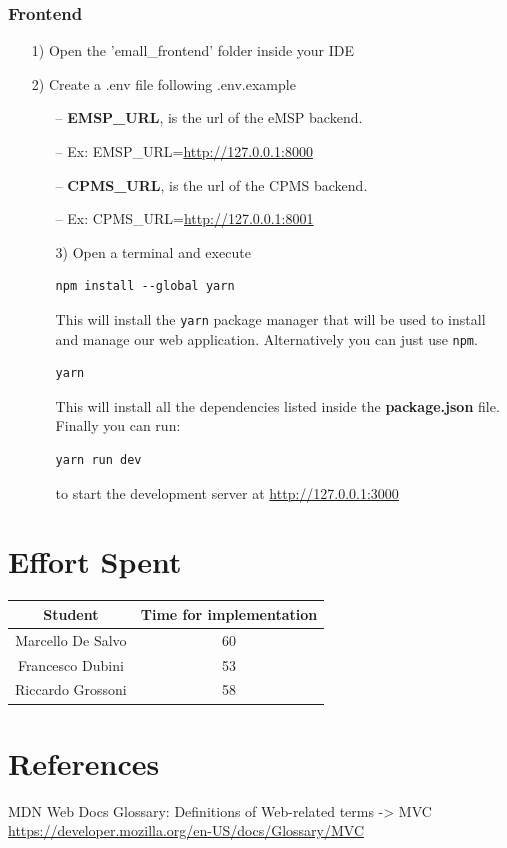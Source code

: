 \documentclass[table, 12pt]{article}
\begin{document}
\subsubsection{Frontend}
\begin{itemize}
    \item[1)] Open the 'emall\_frontend' folder inside your IDE
    \item[2)] Create a .env file following .env.example
    \begin{itemize}
        \item[--]   \textbf{EMSP\_URL}, is the url of the eMSP backend. 
        \item[--]   Ex: EMSP\_URL=\url{http://127.0.0.1:8000}
        \item[--]   \textbf{CPMS\_URL}, is the url of the CPMS backend.
        \item[--]   Ex: CPMS\_URL=\url{http://127.0.0.1:8001}
    \end{itemize}
    \begin{itemize}
        \item[3)] Open a terminal and execute
        \begin{lstlisting}[language=shell]
        npm install --global yarn
        \end{lstlisting}
        This will install the \texttt{yarn} package manager that will be used to install and manage our web application.
        Alternatively you can just use \texttt{npm}.
        \begin{lstlisting}[language=shell]
        yarn
        \end{lstlisting}
        This will install all the dependencies listed inside the \textbf{package.json} file.\\
        Finally you can run:
        \begin{lstlisting}[language=shell]
        yarn run dev
        \end{lstlisting}
        to start the development server at \url{http://127.0.0.1:3000}
    \end{itemize}
\end{itemize}

\newpage
\section{Effort Spent}
    \begin{tabular}{|c||c|}
        \hline
        Student & Time for implementation\\ \hline
        Marcello De Salvo & 60 \\
        Francesco Dubini &  53 \\
        Riccardo Grossoni & 58 \\
        \hline
    \end{tabular}


\section{References}


\begin{thebibliography}{9}
    MDN Web Docs Glossary: Definitions of Web-related terms -> MVC
    \url{https://developer.mozilla.org/en-US/docs/Glossary/MVC}

    
\end{thebibliography}
\end{document}
